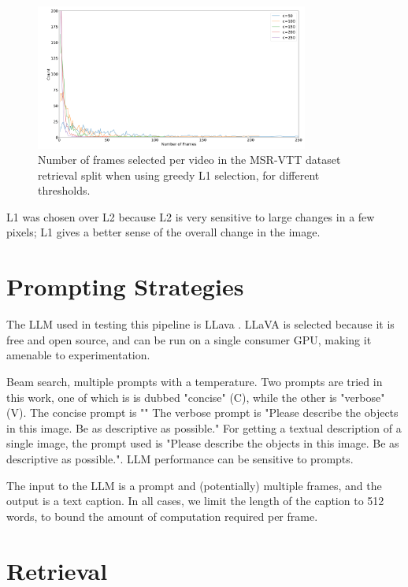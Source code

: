 \begin{figure}
      \centering
      \includegraphics[width=0.8\textwidth]{figures/num_frames_histogram.png}
      \caption{Number of frames selected per video in the MSR-VTT dataset retrieval split when using greedy L1 selection, for different thresholds.}
      \label{fig:optical_flow}
\end{figure}

L1 was chosen over L2 because L2 is very sensitive to large changes in a few pixels; L1 gives a better sense of the overall change in the image.

\section{Prompting Strategies}

The LLM used in testing this pipeline is LLava \cite{llava}.
LLaVA is selected because it is free and open source, and can be run on a single consumer GPU, making it amenable to experimentation.

Beam search, multiple prompts with a temperature.
Two prompts are tried in this work, one of which is is dubbed "concise" (C), while the other is "verbose" (V).
The concise prompt is ""
The verbose prompt is "Please describe the objects in this image. Be as descriptive as possible."
For getting a textual description of a single image, the prompt used is "Please describe the objects in this image. Be as descriptive as possible.".
LLM performance can be sensitive to prompts.

The input to the LLM is a prompt and (potentially) multiple frames, and the output is a text caption.
In all cases, we limit the length of the caption to 512 words, to bound the amount of computation required per frame.

\section{Retrieval}

